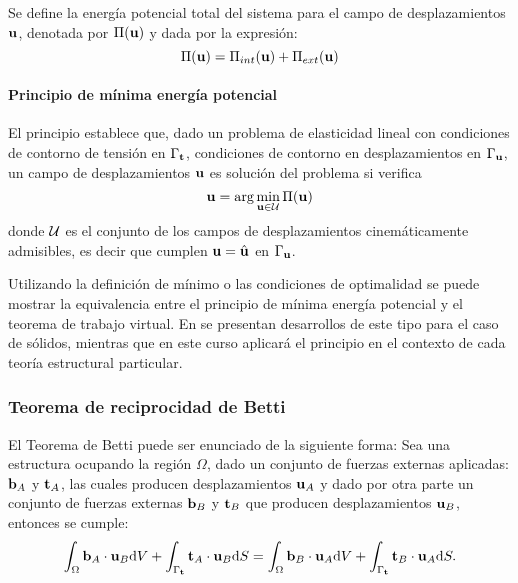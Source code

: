 Se define la energía potencial total del sistema para el campo de desplazamientos ${\bf u}$, denotada por $\Pi({\bf u})$ y dada por la expresión:
%
\begin{equation}
\Pi({\bf u}) = \Pi_{int}({\bf u}) + \Pi_{ext}({\bf u})
\end{equation}

\paragraph{Principio de mínima energía potencial}
El principio establece que, dado un problema de elasticidad lineal con condiciones de contorno de tensión en $\Gamma_{\bf t}$, condiciones de contorno en desplazamientos en $\Gamma_{\bf u}$, un campo de desplazamientos ${\bf u}$ es solución del problema si verifica 
\begin{equation}
{\bf u} = \arg\min_{{\bf u}\in{\mathcal U}} \Pi({\bf u})
\end{equation}
%
donde ${\mathcal U}$ es el conjunto de los campos de desplazamientos cinemáticamente admisibles, es decir que cumplen ${\bf u}=\hat{{\bf u}}$ en $\Gamma_{{\bf u}}$. %
%


Utilizando la definición de mínimo o las condiciones de optimalidad se puede mostrar la equivalencia entre el principio de mínima energía potencial y el teorema de trabajo virtual. %
%
En \citep{CanelasElasticidad} se presentan desarrollos de este tipo para el caso de sólidos, mientras que en este curso aplicará el principio  en el contexto de cada teoría estructural particular.




\subsubsection{Teorema de reciprocidad de Betti} \label{sec:Betti}

El Teorema de Betti puede ser enunciado de la siguiente forma:
Sea una estructura ocupando la región $\Omega$, %
%
dado un conjunto de fuerzas externas aplicadas: ${\bf b}_A$ y ${\bf t}_A$, las cuales producen desplazamientos ${\bf u}_A$ y dado por otra parte un conjunto de fuerzas externas ${\bf b}_B$ y ${\bf t}_B$ que producen desplazamientos ${\bf u}_B$, entonces se cumple:
%
\begin{equation}
\int_{\Omega} {\bf b}_A \cdot {\bf u}_B {\text{d}} V + \int_{\Gamma_{\bf t}} {\bf t}_A \cdot {\bf u}_B {\text{d}} S
=
\int_{\Omega} {\bf b}_B \cdot {\bf u}_A {\text{d}} V + \int_{\Gamma_{\bf t}} {\bf t}_B \cdot {\bf u}_A {\text{d}} S.
\end{equation}


